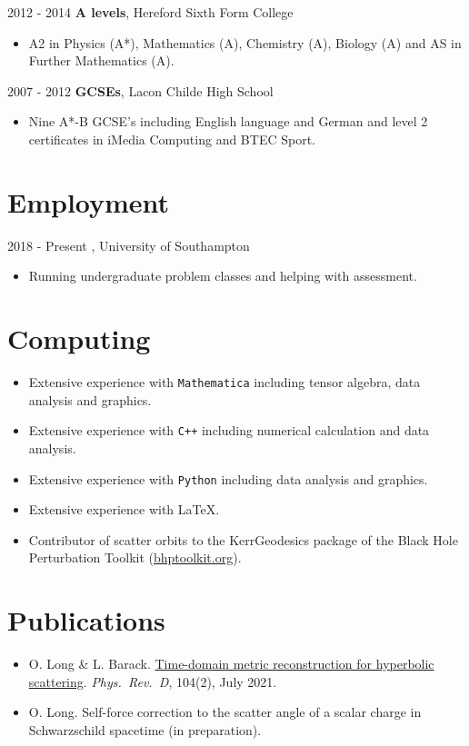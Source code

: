 \documentclass[10.5pt, oneside]{article}   	%
\begin{document}
2012 - 2014  \qquad \textbf{A levels}, Hereford Sixth Form College
\begin{itemize}
\item A2 in Physics (A*), Mathematics (A), Chemistry (A), Biology (A) and AS in Further Mathematics (A).
\end{itemize} 
\vspace{2 mm}
2007 - 2012 \qquad \textbf{GCSEs}, Lacon Childe High School
\begin{itemize}
\item Nine A*-B GCSE's including English language and German and level 2 certificates in iMedia Computing and BTEC Sport.
\end{itemize} 
 
 \section*{Employment}
 2018 - Present , University of Southampton
 \begin{itemize}
\item Running undergraduate problem classes and helping with assessment.
\end{itemize}

 \section*{Computing}
 \begin{itemize}
\item Extensive experience with \texttt{Mathematica} including tensor algebra, data analysis and graphics. 
\item Extensive experience with \texttt{C++} including numerical calculation and data analysis.
\item Extensive experience with \texttt{Python} including data analysis and graphics. 
\item Extensive experience with \LaTeX.
\item Contributor of scatter orbits to the KerrGeodesics package of the Black Hole Perturbation Toolkit (\href{http://bhptoolkit.org/}{bhptoolkit.org}).
\end{itemize}
 

\section*{Publications}
\begin{itemize}
\item O. Long \& L. Barack. \href{https://journals.aps.org/prd/abstract/10.1103/PhysRevD.104.024014}{Time-domain metric reconstruction for hyperbolic scattering}. {\it Phys.\ Rev.\ D}, 104(2), July 2021.
\item O. Long. Self-force correction to the scatter angle of a scalar charge in Schwarzschild spacetime (in preparation).
\end{itemize} 
\end{document}
